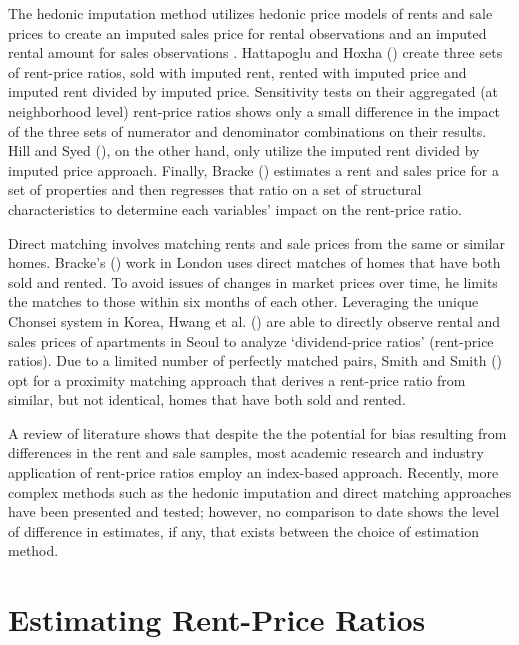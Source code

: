 \documentclass{article}\usepackage[]{graphicx}\usepackage[]{color}
\begin{document}
The hedonic imputation method utilizes hedonic price models of rents and sale prices to create an imputed sales price for rental observations and an imputed rental amount for sales observations \citep*{hattapoglu2014dependency, hill2016}. Hattapoglu and Hoxha (\citeyear{hattapoglu2014dependency}) create three sets of rent-price ratios, sold with imputed rent, rented with imputed price and imputed rent divided by imputed price.  Sensitivity tests on their aggregated (at neighborhood level) rent-price ratios shows only a small difference in the impact of the three sets of numerator and denominator combinations on their results.  Hill and Syed (\citeyear{hill2016}), on the other hand, only utilize the imputed rent divided by imputed price approach. Finally, Bracke (\citeyear{bracke2015house}) estimates a rent and sales price for a set of properties and then regresses that ratio on a set of structural characteristics to determine each variables' impact on the rent-price ratio.\par 

Direct matching involves matching rents and sale prices from the same or similar homes. Bracke's (\citeyear{bracke2015house}) work in London uses direct matches of homes that have both sold and rented.  To avoid issues of changes in market prices over time, he limits the matches to those within six months of each other.  Leveraging the unique Chonsei system in Korea, Hwang et al. (\citeyear{hwang2006dividend}) are able to directly observe rental and sales prices of apartments in Seoul to analyze `dividend-price ratios' (rent-price ratios).  Due to a limited number of perfectly matched pairs, Smith and Smith (\citeyear{smith2006bubble}) opt for a proximity matching approach that derives a rent-price ratio from similar, but not identical, homes that have both sold and rented.\par 

A review of literature shows that despite the the potential for bias resulting from differences in the rent and sale samples, most academic research and industry application of rent-price ratios employ an index-based approach.  Recently, more complex methods such as the hedonic imputation and direct matching approaches have been presented and tested; however, no comparison to date shows the level of difference in estimates, if any, that exists between the choice of estimation method.\par

\section*{Estimating Rent-Price Ratios}
\end{document}
